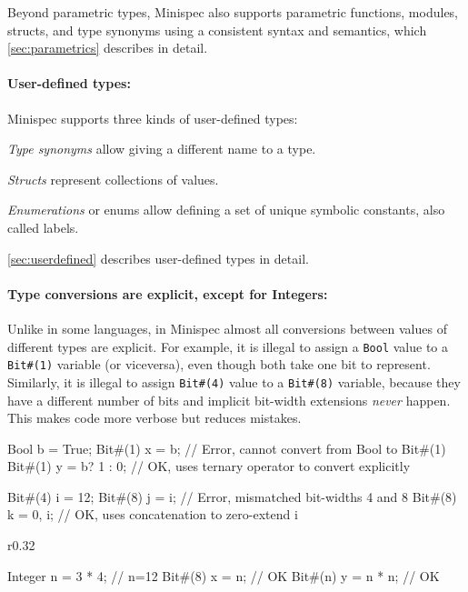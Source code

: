 Beyond parametric types, Minispec also supports parametric functions, modules, structs, and type synonyms
using a consistent syntax and semantics, which \autoref{sec:parametrics} describes in detail.

\paragraph{User-defined types:} Minispec supports three kinds of user-defined types:
\begin{compactitem}
\item \emph{Type synonyms} allow giving a different name to a type.
\item \emph{Structs} represent collections of values.
\item \emph{Enumerations} or enums allow defining a set of unique symbolic constants, also called labels.
\end{compactitem}
\autoref{sec:userdefined} describes user-defined types in detail.

\paragraph{Type conversions are explicit, except for Integers:}
Unlike in some languages, in Minispec almost all conversions between values of different types are explicit.
For example, it is illegal to assign a \texttt{Bool} value to a \texttt{Bit\#(1)} variable (or viceversa),
even though both take one bit to represent.
Similarly, it is illegal to assign \texttt{Bit\#(4)} value to a \texttt{Bit\#(8)} variable, because they have a different number of bits
and implicit bit-width extensions \emph{never} happen.
This makes code more verbose but reduces mistakes.

\begin{mscode}
Bool b = True;
Bit#(1) x = b;  // Error, cannot convert from Bool to Bit#(1)
Bit#(1) y = b? 1 : 0;  // OK, uses ternary operator to convert explicitly

Bit#(4) i = 12;
Bit#(8) j = i;  // Error, mismatched bit-widths 4 and 8
Bit#(8) k = {0, i};  // OK, uses concatenation to zero-extend i
\end{mscode}

\begin{wrapfigure}{r}{0.32\columnwidth}
\vspace{-1.8em}
\begin{mscode}
Integer n = 3 * 4;  // n=12
Bit#(8) x = n;      // OK
Bit#(n) y = n * n;  // OK
\end{mscode}
\vspace{-2em}
\end{wrapfigure}

